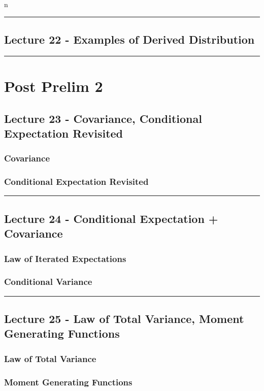 n\documentclass{article}
\begin{document}
\medskip\hrule
\subsection{Lecture 22 - Examples of Derived Distribution}


\medskip\hrule
\pagebreak
\section{Post Prelim 2}

\subsection{Lecture 23 - Covariance, Conditional Expectation Revisited}

\subsubsection{Covariance}

\subsubsection{Conditional Expectation Revisited}


\medskip\hrule
\subsection{Lecture 24 - Conditional Expectation + Covariance}

\subsubsection{Law of Iterated Expectations}

\subsubsection{Conditional Variance}


\medskip\hrule
\subsection{Lecture 25 - Law of Total Variance, Moment Generating Functions}

\subsubsection{Law of Total Variance}

\subsubsection{Moment Generating Functions}
\end{document}

